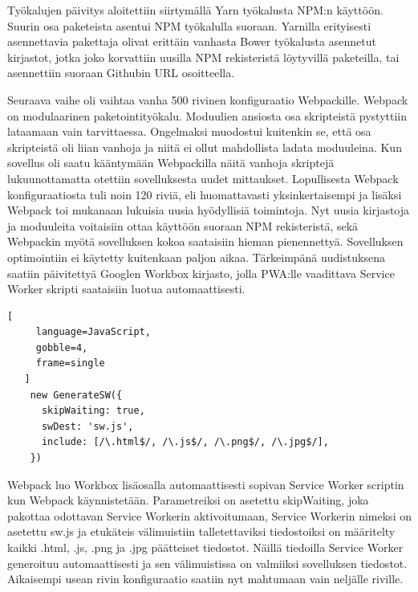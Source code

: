 \documentclass{tktltiki}
\begin{document}
Työkalujen päivitys aloitettiin siirtymällä Yarn työkalusta NPM:n käyttöön. Suurin osa paketeista asentui NPM työkalulla suoraan. Yarnilla erityisesti asennettavia pakettaja olivat erittäin vanhasta Bower työkalusta asennetut kirjastot, jotka joko korvattiin uusilla NPM rekisteristä löytyvillä paketeilla, tai asennettiin suoraan Githubin URL osoitteella. 

Seuraava vaihe oli vaihtaa vanha 500 rivinen konfiguraatio Webpackille. Webpack on modulaarinen paketointityökalu. Moduulien ansiosta osa skripteistä pystyttiin lataamaan vain tarvittaessa. Ongelmaksi muodostui kuitenkin se, että osa skripteistä oli liian vanhoja ja niitä ei ollut mahdollista ladata moduuleina. Kun sovellus oli saatu kääntymään Webpackilla näitä vanhoja skriptejä lukuunottamatta otettiin sovelluksesta uudet mittaukset. Lopullisesta Webpack konfiguraatiosta tuli noin 120 riviä, eli huomattavasti yksinkertaisempi ja lisäksi Webpack toi mukanaan lukuisia uusia hyödyllisiä toimintoja. Nyt uusia kirjastoja ja moduuleita voitaisiin ottaa käyttöön suoraan NPM rekisteristä, sekä Webpackin myötä sovelluksen kokoa saataisiin hieman pienennettyä. Sovelluksen optimointiin ei käytetty kuitenkaan paljon aikaa. Tärkeimpänä uudistuksena saatiin päivitettyä Googlen Workbox kirjasto, jolla PWA:lle vaadittava Service Worker skripti saataisiin luotua automaattisesti.

\begin{lstlisting}[
     language=JavaScript,
     gobble=4,
     frame=single
   ]
    new GenerateSW({
      skipWaiting: true,
      swDest: 'sw.js',
      include: [/\.html$/, /\.js$/, /\.png$/, /\.jpg$/],
    })
\end{lstlisting}

Webpack luo Workbox lisäosalla automaattisesti sopivan Service Worker scriptin kun Webpack käynnistetään. Parametreiksi on asetettu skipWaiting, joka pakottaa odottavan Service Workerin aktivoitumaan, Service Workerin nimeksi on asetettu sw.js ja etukäteis välimuistiin talletettaviksi tiedostoiksi on määritelty kaikki .html, .js, .png ja .jpg päätteiset tiedostot. Näillä tiedoilla Service Worker generoituu automaattisesti ja sen välimuistissa on valmiiksi sovelluksen tiedostot. Aikaisempi usean rivin konfiguraatio saatiin nyt mahtumaan vain neljälle riville. 
\end{document}
